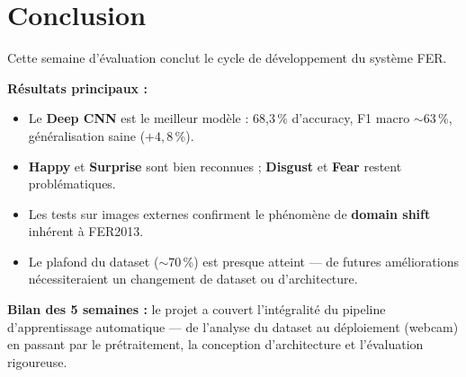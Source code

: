 \documentclass[12pt,a4paper]{article}
\begin{document}
\section{Conclusion}

\begin{tcolorbox}[colback=primary!8, colframe=primary, arc=4pt,
                  title={\bfseries Bilan de la Semaine 5}]
Cette semaine d'évaluation conclut le cycle de développement du système FER.

\medskip
\textbf{Résultats principaux :}
\begin{itemize}[noitemsep]
  \item Le \textbf{Deep CNN} est le meilleur modèle : 68,3\,\% d'accuracy,
        F1 macro $\sim$63\,\%, généralisation saine ($+4,8$\,\%).
  \item \textbf{Happy} et \textbf{Surprise} sont bien reconnues ; \textbf{Disgust}
        et \textbf{Fear} restent problématiques.
  \item Les tests sur images externes confirment le phénomène de
        \textbf{domain shift} inhérent à FER2013.
  \item Le plafond du dataset ($\sim$70\,\%) est presque atteint — de
        futures améliorations nécessiteraient un changement de dataset
        ou d'architecture.
\end{itemize}

\medskip
\textbf{Bilan des 5 semaines :} le projet a couvert l'intégralité du pipeline
d'apprentissage automatique — de l'analyse du dataset au déploiement (webcam)
en passant par le prétraitement, la conception d'architecture et l'évaluation
rigoureuse.
\end{tcolorbox}
\end{document}
